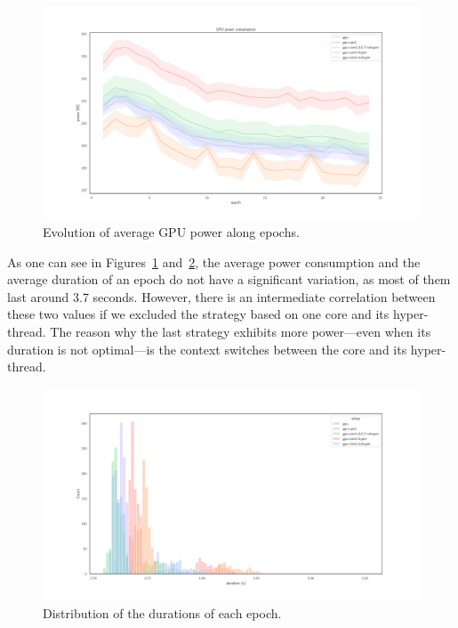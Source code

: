 \begin{figure}
    \centering
    \includegraphics[width=1.1\textwidth]{imgs/power_gpu_baedonepoche.pdf}
    \caption{Evolution of average GPU power along epochs.}
    \label{fig:ephoch_power}
\end{figure}

As one can see in Figures~\ref{fig:ephoch_power} and~\ref{fig:epoch_duration}, the average power consumption and the average duration of an epoch do not have a significant variation, as most of them last around 3.7 seconds.
However, there is an intermediate correlation between these two values if we excluded the strategy based on one core and its hyper-thread.
The reason why the last strategy exhibits more power---even when its duration is not optimal---is the context switches between the core and its hyper-thread.

\begin{figure}
    \centering
    \includegraphics[width=1.1\textwidth]{imgs/epoch_duration.pdf}
    \caption{Distribution of the durations of each epoch.}
    \label{fig:epoch_duration}
\end{figure}

